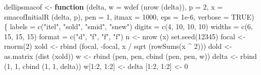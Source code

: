\documentclass[
  12pt,
  letterpaper,
  DIV=11,
  numbers=noendperiod]{scrreprt}
\newenvironment{Shaded}{\begin{snugshade}}{\end{snugshade}}
\newcommand{\AttributeTok}[1]{\textcolor[rgb]{0.40,0.45,0.13}{#1}}
\newcommand{\ConstantTok}[1]{\textcolor[rgb]{0.56,0.35,0.01}{#1}}
\newcommand{\ControlFlowTok}[1]{\textcolor[rgb]{0.00,0.23,0.31}{\textbf{#1}}}
\newcommand{\DecValTok}[1]{\textcolor[rgb]{0.68,0.00,0.00}{#1}}
\newcommand{\FloatTok}[1]{\textcolor[rgb]{0.68,0.00,0.00}{#1}}
\newcommand{\FunctionTok}[1]{\textcolor[rgb]{0.28,0.35,0.67}{#1}}
\newcommand{\NormalTok}[1]{\textcolor[rgb]{0.00,0.23,0.31}{#1}}
\newcommand{\OtherTok}[1]{\textcolor[rgb]{0.00,0.23,0.31}{#1}}
\newcommand{\SpecialCharTok}[1]{\textcolor[rgb]{0.37,0.37,0.37}{#1}}
\newcommand{\StringTok}[1]{\textcolor[rgb]{0.13,0.47,0.30}{#1}}
\theoremstyle{remark}
\begin{document}
\begin{Shaded}
\begin{Highlighting}[]
\NormalTok{dellipsmacof }\OtherTok{\textless{}{-}}
  \ControlFlowTok{function}\NormalTok{ (delta,}
            \AttributeTok{w =} \FunctionTok{wdef}\NormalTok{ (}\FunctionTok{nrow}\NormalTok{ (delta)),}
            \AttributeTok{p =} \DecValTok{2}\NormalTok{,}
            \AttributeTok{x =} \FunctionTok{smacofInitialR}\NormalTok{ (delta, p),}
            \AttributeTok{pen =} \DecValTok{1}\NormalTok{,}
            \AttributeTok{itmax =} \DecValTok{1000}\NormalTok{,}
            \AttributeTok{eps =} \FloatTok{1e{-}6}\NormalTok{,}
            \AttributeTok{verbose =} \ConstantTok{TRUE}\NormalTok{) \{}
\NormalTok{    labels }\OtherTok{=} \FunctionTok{c}\NormalTok{(}\StringTok{"itel"}\NormalTok{, }\StringTok{"sold"}\NormalTok{, }\StringTok{"smid"}\NormalTok{, }\StringTok{"snew"}\NormalTok{)}
\NormalTok{    digits }\OtherTok{=} \FunctionTok{c}\NormalTok{(}\DecValTok{4}\NormalTok{, }\DecValTok{10}\NormalTok{, }\DecValTok{10}\NormalTok{, }\DecValTok{10}\NormalTok{)}
\NormalTok{    widths }\OtherTok{=} \FunctionTok{c}\NormalTok{(}\DecValTok{6}\NormalTok{, }\DecValTok{15}\NormalTok{, }\DecValTok{15}\NormalTok{, }\DecValTok{15}\NormalTok{)}
\NormalTok{    format }\OtherTok{=} \FunctionTok{c}\NormalTok{(}\StringTok{"d"}\NormalTok{, }\StringTok{"f"}\NormalTok{, }\StringTok{"f"}\NormalTok{, }\StringTok{"f"}\NormalTok{)}
\NormalTok{    n }\OtherTok{\textless{}{-}} \FunctionTok{nrow}\NormalTok{ (x)}
    \FunctionTok{set.seed}\NormalTok{(}\DecValTok{12345}\NormalTok{)}
\NormalTok{    focal }\OtherTok{\textless{}{-}} \FunctionTok{rnorm}\NormalTok{(}\DecValTok{2}\NormalTok{)}
\NormalTok{    xold }\OtherTok{\textless{}{-}}
      \FunctionTok{rbind}\NormalTok{ (focal, }\SpecialCharTok{{-}}\NormalTok{focal, x }\SpecialCharTok{/} \FunctionTok{sqrt}\NormalTok{ (}\FunctionTok{rowSums}\NormalTok{(x }\SpecialCharTok{\^{}} \DecValTok{2}\NormalTok{)))}
\NormalTok{    dold }\OtherTok{\textless{}{-}} \FunctionTok{as.matrix}\NormalTok{ (}\FunctionTok{dist}\NormalTok{ (xold))}
\NormalTok{    w }\OtherTok{\textless{}{-}} \FunctionTok{rbind}\NormalTok{ (pen, pen, }\FunctionTok{cbind}\NormalTok{ (pen, pen, w))}
\NormalTok{    delta }\OtherTok{\textless{}{-}} \FunctionTok{rbind}\NormalTok{ (}\DecValTok{1}\NormalTok{, }\DecValTok{1}\NormalTok{, }\FunctionTok{cbind}\NormalTok{ (}\DecValTok{1}\NormalTok{, }\DecValTok{1}\NormalTok{, delta))}
\NormalTok{    w[}\DecValTok{1}\SpecialCharTok{:}\DecValTok{2}\NormalTok{, }\DecValTok{1}\SpecialCharTok{:}\DecValTok{2}\NormalTok{] }\OtherTok{\textless{}{-}}\NormalTok{ delta [}\DecValTok{1}\SpecialCharTok{:}\DecValTok{2}\NormalTok{, }\DecValTok{1}\SpecialCharTok{:}\DecValTok{2}\NormalTok{] }\OtherTok{\textless{}{-}} \DecValTok{0}

\end{Highlighting}
\end{Shaded}
\end{document}
